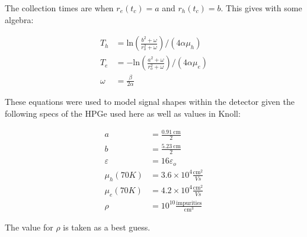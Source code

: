 The collection times are when $r_{e}(t_c) = a$ and $r_{h}(t_c) = b$. This gives with some algebra:

\begin{equation}
\begin{aligned}\label{times_general}
  T_{h} &= \mathrm{ln}\left(\frac{b^2 + \omega}{r_{o}^2 + \omega} \right)/(4 \alpha \mu_{h})\\
  T_{e} &= -\mathrm{ln}\left(\frac{a^2 + \omega}{r_{o}^2 + \omega} \right)/(4 \alpha \mu_{e})\\
  \omega &= \frac{\beta}{2\alpha} \nonumber
\end{aligned}
\end{equation}

These equations were used to model signal shapes within the detector given the following specs of the HPGe used here as well as values in Knoll:\cite{knoll} 

\begin{align}
    a &= \frac{0.91\ \mathrm{cm}}{2}\nonumber \\
    b &= \frac{5.23\ \mathrm{cm}}{2} \nonumber \\
    \varepsilon &= 16\varepsilon_{o} \nonumber \\ \mu_{h}(70K) &=  3.6 \times 10^{4} \frac{\mathrm{cm^2}}{Vs} \nonumber \\
    \mu_{e}(70K) &=  4.2 \times 10^{4} \frac{\mathrm{cm^2}}{Vs}  \nonumber \\
   \rho &= 10^{10} \frac{\mathrm{impurities}}{\mathrm{cm}^3}
\end{align}

The value for $\rho$ is taken as a best guess.

